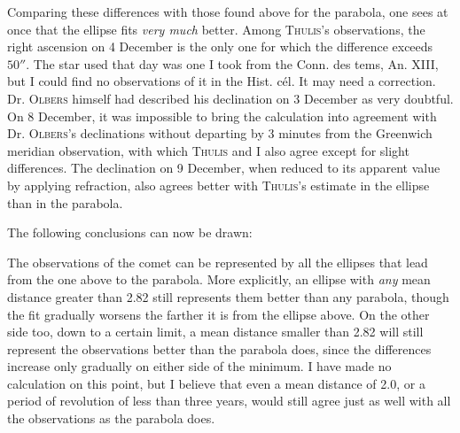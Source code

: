 %
\par\indent Comparing these differences with those found above for the parabola, one sees at once that the ellipse fits \emph{very much} better. Among \textsc{Thulis}’s observations, the right ascension on 4 December is the only one for which the difference exceeds $50''$. The star used that day was one I took from the Conn. des tems, An. XIII, but I could find no observations of it in the Hist. cél. It may need a correction. Dr. \textsc{Olbers} himself had described his declination on 3 December as very doubtful. On 8 December, it was impossible to bring the calculation into agreement with Dr. \textsc{Olbers}’s declinations without departing by 3 minutes from the Greenwich meridian observation, with which \textsc{Thulis} and I also agree except for slight differences. The declination on 9 December, when reduced to its apparent value by applying refraction, also agrees better with \textsc{Thulis}’s estimate in the ellipse than in the parabola.

\par\indent The following conclusions can now be drawn:

\par\indent The observations of the comet can be represented by all the ellipses that lead from the one above to the parabola. More explicitly, an ellipse with \emph{any} mean distance greater than 2.82 still represents them better than any parabola, though the fit gradually worsens the farther it is from the ellipse above. On the other side too, down to a certain limit, a mean distance smaller than 2.82 will still represent the observations better than the parabola does, since the differences increase only gradually on either side of the minimum. I have made no calculation on this point, but I believe that even a mean distance of 2.0, or a period of revolution of less than three years, would still agree just as well with all the observations as the parabola does.

